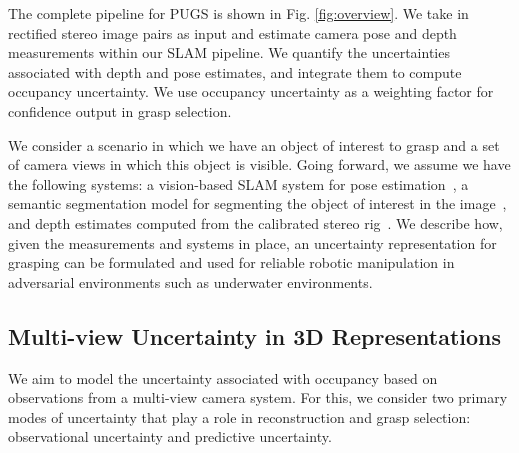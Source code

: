 The complete pipeline for PUGS is shown in Fig. \ref{fig:overview}.
We take in rectified stereo image pairs as input and estimate camera pose and depth measurements within our SLAM pipeline.
We quantify the uncertainties associated with depth and pose estimates, and integrate them to compute occupancy uncertainty. %
We use occupancy uncertainty as a weighting factor for confidence output in grasp selection.



We consider a scenario in which we have an object of interest to grasp and a set of camera views in which this object is visible. 
Going forward, we assume we have the following systems: a vision-based SLAM system for pose estimation~\cite{labbe_rtabmap_2019}, a semantic segmentation model for segmenting the object of interest in the image~\cite{wu2019detectron2}, and depth estimates computed from the calibrated stereo rig~\cite{lipson2021raft}.
We describe how, given the measurements and systems in place, an uncertainty representation for grasping can be formulated and used for reliable robotic manipulation in adversarial environments such as underwater environments.

\subsection{Multi-view Uncertainty in 3D Representations}
We aim to model the uncertainty associated with occupancy based on observations from a multi-view camera system.
For this, we consider two primary modes of uncertainty that play a role in reconstruction and grasp selection: observational uncertainty and predictive uncertainty. 

